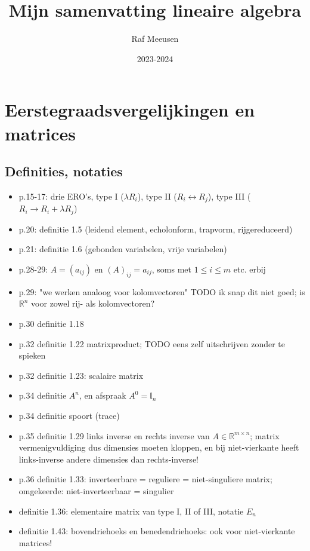 \documentclass{article}
\title{Mijn samenvatting lineaire algebra}
\author{Raf Meeusen}
\date{2023-2024}
\begin{document}
\maketitle

\section{Eerstegraadsvergelijkingen en matrices}

\subsection{Definities, notaties}

\begin{itemize}
    \item p.15-17: drie ERO's, type I ($\lambda R_i$), type II ($R_i \leftrightarrow R_j$), type III ($R_i \rightarrow R_i + \lambda R_j$)
    \item p.20: definitie 1.5 (leidend element, echolonform, trapvorm, rijgereduceerd) 
    \item p.21: definitie 1.6 (gebonden variabelen, vrije variabelen) 
    \item p.28-29: $A=(a_{ij})$ en $(A)_{ij} = a_{ij}$, soms met $1 \leq i \leq m$ etc. erbij
    \item p.29: "we werken analoog voor kolomvectoren" TODO ik snap dit niet goed; is $\mathbb{R}^n$ voor zowel rij- als kolomvectoren? 
    \item p.30 definitie 1.18  
    \item p.32 definitie 1.22 matrixproduct;  TODO eens zelf uitschrijven zonder te spieken
    \item p.32 definitie 1.23: scalaire matrix
    \item p.34 definitie $A^n$, en afspraak $A^0 = \mathbb{I}_n$
    \item p.34 definitie spoort (trace) 
    \item p.35 definitie 1.29 links inverse en rechts inverse van $A \in \mathbb{R}^{m \times n} $; matrix vermenigvuldiging dus dimensies moeten kloppen, en bij niet-vierkante heeft links-inverse andere dimensies dan rechts-inverse! 
    \item p.36 definitie 1.33: inverteerbare = reguliere = niet-singuliere matrix; omgekeerde: niet-inverteerbaar = singulier
    \item definitie 1.36: elementaire matrix van type I, II of III, notatie $E_n$
    \item definitie 1.43: bovendriehoeks en benedendriehoeks: ook voor niet-vierkante matrices! 
\end{itemize}
\end{document}
